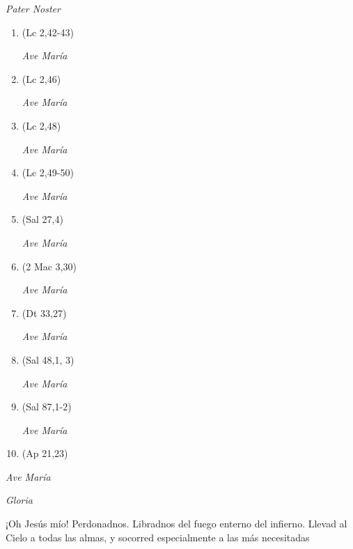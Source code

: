 \documentclass[a4paper,11pt, oneside]{report}
\begin{document}
        \textit{Pater Noster}

        \begin{enumerate}

          \item (Lc 2,42-43)
          
          \textit{Ave María}

          \item (Lc 2,46)
          
          \textit{Ave María}

          \item (Lc 2,48)
          
          \textit{Ave María}

          \item (Lc 2,49-50)
          
          \textit{Ave María}

          \item (Sal 27,4)

          \textit{Ave María}

          \item (2 Mac 3,30)
          
          \textit{Ave María}

          \item (Dt 33,27)
          
          \textit{Ave María}

          \item (Sal 48,1, 3)
          
          \textit{Ave María}

          \item (Sal 87,1-2)
          
          \textit{Ave María}

          \item (Ap 21,23)

        \end{enumerate}

        \textit{Ave María} \par
        \indent\textit{Gloria} \par
        \indent¡Oh Jesús mío! Perdonadnos. Libradnos del fuego enterno del infierno. Llevad al Cielo a todas las almas, y socorred especialmente a las más 
        necesitadas
        
\end{document}
